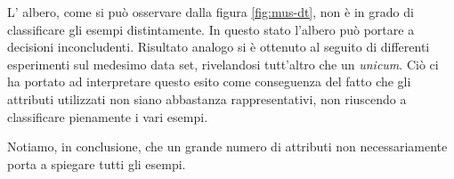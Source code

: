 					
			L' albero, come si può osservare dalla figura \vref{fig:mus-dt}, non è in grado di classificare gli esempi distintamente. In questo stato l'albero può portare a decisioni inconcludenti. Risultato analogo si è ottenuto al seguito di differenti esperimenti sul medesimo data set, rivelandosi tutt'altro che un \textit{unicum}. Ciò ci ha portato ad interpretare questo esito come conseguenza del fatto che gli attributi utilizzati non siano abbastanza rappresentativi, non riuscendo a classificare pienamente i vari esempi.
			
		    
			Notiamo, in conclusione, che un grande numero di attributi non necessariamente porta a spiegare tutti gli esempi.
			
